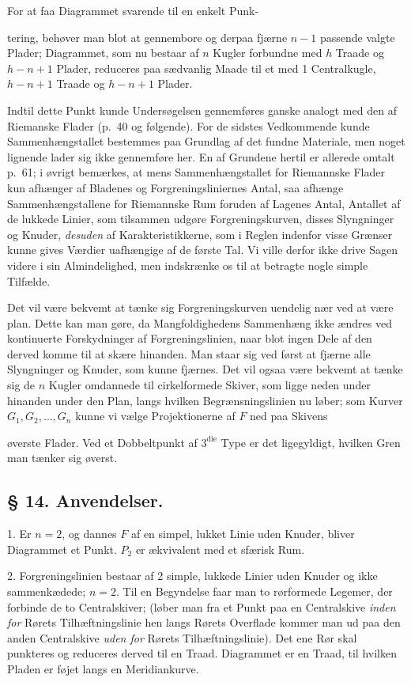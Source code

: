 \documentclass{article}
\begin{document}
For at faa Diagrammet svarende til en enkelt Punk-

tering, behøver man blot at gennembore og derpaa fjærne $n - 1$ passende valgte Plader; Diagrammet, som nu bestaar af $n$ Kugler forbundne med $h$ Traade og $h - n + 1$ Plader, reduceres paa sædvanlig Maade til et med 1 Centralkugle, $h - n + 1$ Traade og $h - n + 1$ Plader.

Indtil dette Punkt kunde Undersøgelsen gennemføres ganske analogt med den af Riemanske Flader (p.\ 40 og følgende). For de sidstes Vedkommende kunde Sammenhængstallet bestemmes paa Grundlag af det fundne Materiale, men noget lignende lader sig ikke gennemføre her. En af Grundene hertil er allerede omtalt p.\ 61; i øvrigt bemærkes, at mens Sammenhængstallet for Riemannske Flader kun afhænger af Bladenes og Forgreningsliniernes Antal, saa afhænge Sammenhængstallene for Riemannske Rum foruden af Lagenes Antal, Antallet af de lukkede Linier, som tilsammen udgøre Forgreningskurven, disses Slyngninger og Knuder, \emph{desuden} af Karakteristikkerne, som i Reglen indenfor visse Grænser kunne gives Værdier uafhængige af de første Tal. Vi ville derfor ikke drive Sagen videre i sin Almindelighed, men indskrænke os til at betragte nogle simple Tilfælde.

Det vil være bekvemt at tænke sig Forgreningskurven uendelig nær ved at være plan. Dette kan man gøre, da Mangfoldighedens Sammenhæng ikke ændres ved kontinuerte Forskydninger af Forgreningslinien, naar blot ingen Dele af den derved komme til at skære hinanden. Man staar sig ved først at fjærne alle Slyngninger og Knuder, som kunne fjærnes. Det vil ogsaa være bekvemt at tænke sig de $n$ Kugler omdannede til cirkelformede Skiver, som ligge neden under hinanden under den Plan, langs hvilken Begrænsningslinien nu løber; som Kurver $G_1, G_2, \dots, G_n$ kunne vi vælge Projektionerne af $F$ ned paa Skivens

øverste Flader. Ved et Dobbeltpunkt af $3^{\text{die}}$ Type er det ligegyldigt, hvilken Gren man tænker sig øverst.

\subsection*{§ 14. Anvendelser.}

1. Er $n = 2$, og dannes $F$ af en simpel, lukket Linie uden Knuder, bliver Diagrammet et Punkt. $P_2$ er ækvivalent med et sfærisk Rum.

2. Forgreningslinien bestaar af 2 simple, lukkede Linier uden Knuder og ikke sammenkædede; $n = 2$. Til en Begyndelse faar man to rørformede Legemer, der forbinde de to Centralskiver; (løber man fra et Punkt paa en Centralskive \emph{inden for} Rørets Tilhæftningslinie hen langs Rørets Overflade kommer man ud paa den anden Centralskive \emph{uden for} Rørets Tilhæftningslinie). Det ene Rør skal punkteres og reduceres derved til en Traad. Diagrammet er en Traad, til hvilken Pladen er føjet langs en Meridiankurve.
\end{document}
